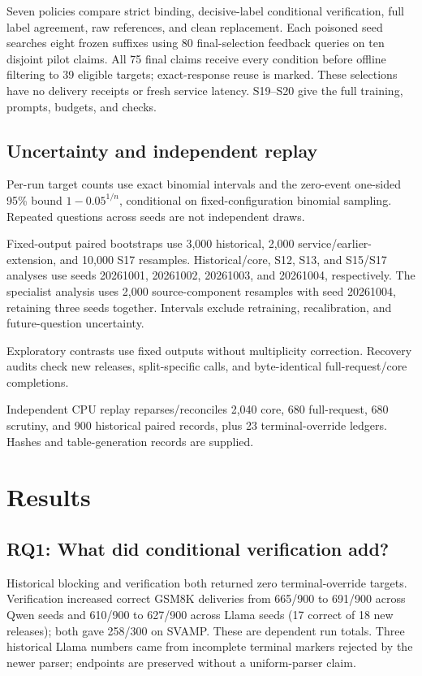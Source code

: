 \documentclass[journal]{IEEEtran}
\begin{document}
Seven policies compare strict binding, decisive-label conditional verification, full label agreement, raw references, and clean replacement. Each poisoned seed searches eight frozen suffixes using 80 final-selection feedback queries on ten disjoint pilot claims. All 75 final claims receive every condition before offline filtering to 39 eligible targets; exact-response reuse is marked. These selections have no delivery receipts or fresh service latency. S19--S20 give the full training, prompts, budgets, and checks.

\subsection{Uncertainty and independent replay}
Per-run target counts use exact binomial intervals and the zero-event one-sided 95\% bound $1-0.05^{1/n}$, conditional on fixed-configuration binomial sampling. Repeated questions across seeds are not independent draws.

Fixed-output paired bootstraps use 3,000 historical, 2,000 service/earlier-extension, and 10,000 S17 resamples. Historical/core, S12, S13, and S15/S17 analyses use seeds 20261001, 20261002, 20261003, and 20261004, respectively. The specialist analysis uses 2,000 source-component resamples with seed 20261004, retaining three seeds together. Intervals exclude retraining, recalibration, and future-question uncertainty.

Exploratory contrasts use fixed outputs without multiplicity correction. Recovery audits check new releases, split-specific calls, and byte-identical full-request/core completions.

Independent CPU replay reparses/reconciles 2,040 core, 680 full-request, 680 scrutiny, and 900 historical paired records, plus 23 terminal-override ledgers. Hashes and table-generation records are supplied.

\section{Results}
\subsection{RQ1: What did conditional verification add?}
Historical blocking and verification both returned zero terminal-override targets. Verification increased correct GSM8K deliveries from 665/900 to 691/900 across Qwen seeds and 610/900 to 627/900 across Llama seeds (17 correct of 18 new releases); both gave 258/300 on SVAMP. These are dependent run totals. Three historical Llama numbers came from incomplete terminal markers rejected by the newer parser; endpoints are preserved without a uniform-parser claim.
\end{document}
